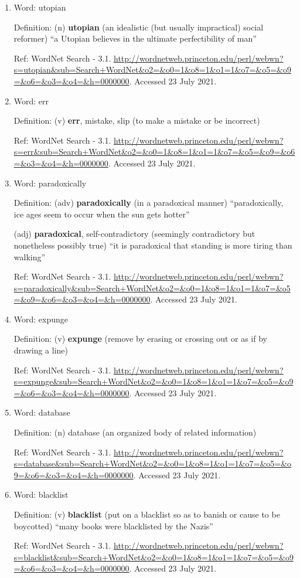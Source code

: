 \documentclass[11pt]{article}
\begin{document}
\begin{enumerate}
\item Word: utopian

Definition: (n) \textbf{utopian} (an idealistic (but usually impractical) social reformer) ``a Utopian believes in the ultimate perfectibility of man''

Ref: WordNet Search - 3.1. \url{http://wordnetweb.princeton.edu/perl/webwn?s=utopian\&sub=Search+WordNet\&o2=\&o0=1\&o8=1\&o1=1\&o7=\&o5=\&o9=\&o6=\&o3=\&o4=\&h=0000000}. Accessed 23 July 2021.

\item Word: err

Definition: (v) \textbf{err}, mistake, slip (to make a mistake or be incorrect)

Ref: WordNet Search - 3.1. \url{http://wordnetweb.princeton.edu/perl/webwn?s=err\&sub=Search+WordNet\&o2=\&o0=1\&o8=1\&o1=1\&o7=\&o5=\&o9=\&o6=\&o3=\&o4=\&h=0000000}. Accessed 23 July 2021.

\item Word: paradoxically

Definition: (adv) \textbf{paradoxically} (in a paradoxical manner) ``paradoxically,  ice ages seem to occur when the sun gets hotter''

(adj) \textbf{paradoxical}, self-contradictory (seemingly contradictory but nonetheless possibly true) ``it is paradoxical that standing is more tiring than walking''

Ref: WordNet Search - 3.1. \url{http://wordnetweb.princeton.edu/perl/webwn?s=paradoxically\&sub=Search+WordNet\&o2=\&o0=1\&o8=1\&o1=1\&o7=\&o5=\&o9=\&o6=\&o3=\&o4=\&h=0000000}. Accessed 23 July 2021.

\item Word: expunge

Definition: (v)  \textbf{expunge} (remove by erasing or crossing out or as if by drawing a line)

Ref: WordNet Search - 3.1.
\url{http://wordnetweb.princeton.edu/perl/webwn?s=expunge\&sub=Search+WordNet\&o2=\&o0=1\&o8=1\&o1=1\&o7=\&o5=\&o9=\&o6=\&o3=\&o4=\&h=0000000}. Accessed 23 July 2021.

\item Word: database

Definition: (n) database (an organized body of related information)

Ref: WordNet Search - 3.1.
\url{http://wordnetweb.princeton.edu/perl/webwn?s=database\&sub=Search+WordNet\&o2=\&o0=1\&o8=1\&o1=1\&o7=\&o5=\&o9=\&o6=\&o3=\&o4=\&h=0000000}. Accessed 23 July 2021.

\item Word: blacklist

Definition: (v) \textbf{blacklist} (put on a blacklist so as to banish or cause to be boycotted) ``many books were blacklisted by the Nazis''

Ref: WordNet Search - 3.1.
\url{http://wordnetweb.princeton.edu/perl/webwn?s=blacklist\&sub=Search+WordNet\&o2=\&o0=1\&o8=1\&o1=1\&o7=\&o5=\&o9=\&o6=\&o3=\&o4=\&h=0000000}. Accessed 23 July 2021.
\end{enumerate}
\end{document}
